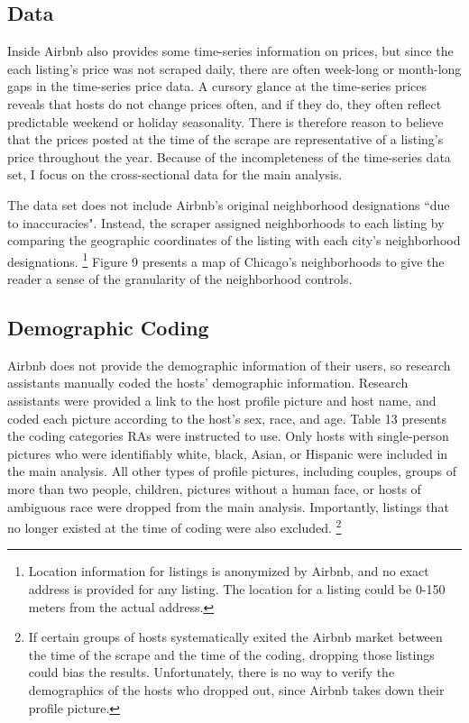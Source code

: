 \subsection*{Data}

Inside Airbnb also provides some time-series information on prices, but since the each listing's price was not scraped daily, there are often week-long or month-long gaps in the time-series price data. A cursory glance at the time-series prices reveals that hosts do not change prices often, and if they do, they often reflect predictable weekend or holiday seasonality. There is therefore reason to believe that the prices posted at the time of the scrape are representative of a listing's price throughout the year. Because of the incompleteness of the time-series data set, I focus on the cross-sectional data for the main analysis.  

The data set does not include Airbnb's original neighborhood designations ``due to inaccuracies". Instead, the scraper assigned neighborhoods to each listing by comparing the geographic coordinates of the listing with each city's neighborhood designations.%
	\footnote{Location information for listings is anonymized by Airbnb, and no exact address is provided for any listing. The location for a listing could be 0-150 meters from the actual address.} 
Figure 9 presents a map of Chicago's neighborhoods to give the reader a sense of the granularity of the neighborhood controls. 

\subsection*{Demographic Coding}

Airbnb does not provide the demographic information of their users, so research assistants manually coded the hosts' demographic information. Research assistants were provided a link to the host profile picture and host name, and coded each picture according to the host's sex, race, and age. Table 13 presents the coding categories RAs were instructed to use. Only hosts with single-person pictures who were identifiably white, black, Asian, or Hispanic were included in the main analysis. All other types of profile pictures, including couples, groups of more than two people, children, pictures without a human face, or hosts of ambiguous race were dropped from the main analysis. Importantly, listings that no longer existed at the time of coding were also excluded.%
	\footnote{If certain groups of hosts systematically exited the Airbnb market between the time of the scrape and the time of the coding, dropping those listings could bias the results. Unfortunately, there is no way to verify the demographics of the hosts who dropped out, since Airbnb takes down their profile picture.}


